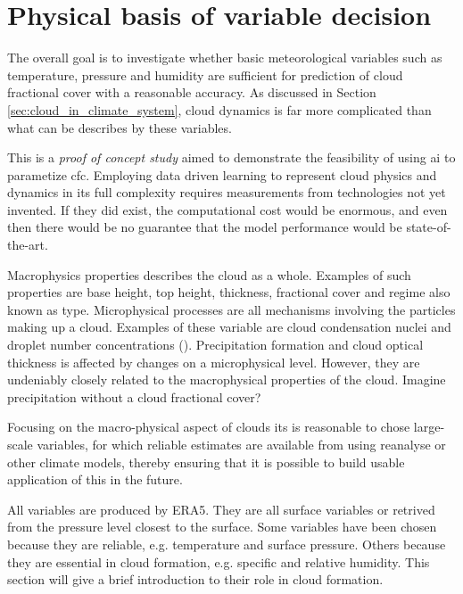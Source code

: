 \section{Physical basis of variable decision} \label{sec:ecc}
The overall goal is to investigate whether basic meteorological variables such as temperature, pressure and humidity are sufficient for prediction of cloud fractional cover with a reasonable accuracy. As discussed in Section \ref{sec:cloud_in_climate_system}, cloud dynamics is far more complicated than what can be describes by these variables. 

This is a \textit{proof of concept study} aimed to demonstrate the feasibility of using \acrshort{ai} to parametize \acrshort{cfc}. Employing data driven learning to represent cloud physics and dynamics in its full complexity requires measurements from technologies not yet invented. If they did exist, the computational cost would be enormous, and even then there would be no guarantee that the model performance would be state-of-the-art.

Macrophysics properties describes the cloud as a whole. Examples of such properties are base height, top height, thickness, fractional cover and regime also known as type. Microphysical processes are all mechanisms involving the particles making up a cloud. Examples of these variable are cloud condensation nuclei and droplet number concentrations (\cite{Grabowski2019ModelingBetter}). Precipitation formation and cloud optical thickness is affected by changes on a microphysical level. However, they are undeniably closely related to the macrophysical properties of the cloud. Imagine precipitation without a cloud fractional cover? 

Focusing on the macro-physical aspect of clouds its is reasonable to chose large-scale variables, for which reliable estimates are available from using reanalyse or other climate models, thereby ensuring that it is possible to build usable application of this in the future. 

All variables are produced by ERA5. They are all surface variables or retrived from the pressure level closest to the surface. Some variables have been chosen because they are reliable, e.g. temperature and surface pressure. Others because they are essential in cloud formation, e.g. specific and relative humidity. This section will give a brief introduction to their role in cloud formation. 


